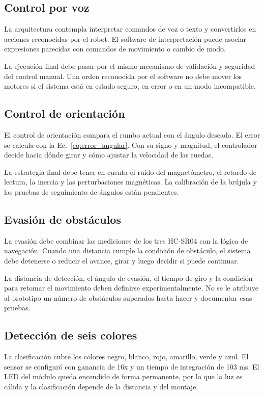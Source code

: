 \documentclass[journal]{IEEEtran}
\begin{document}
\subsection{Control por voz}

La arquitectura contempla interpretar comandos de voz o texto y convertirlos en acciones reconocidas por el robot. El software de interpretación puede asociar expresiones parecidas con comandos de movimiento o cambio de modo.

La ejecución final debe pasar por el mismo mecanismo de validación y seguridad del control manual. Una orden reconocida por el software no debe mover los motores si el sistema está en estado seguro, en error o en un modo incompatible.

\subsection{Control de orientación}

El control de orientación compara el rumbo actual con el ángulo deseado. El error se calcula con la Ec.~\ref{eq:error_angular}. Con su signo y magnitud, el controlador decide hacia dónde girar y cómo ajustar la velocidad de las ruedas.

La estrategia final debe tener en cuenta el ruido del magnetómetro, el retardo de lectura, la inercia y las perturbaciones magnéticas. La calibración de la brújula y las pruebas de seguimiento de ángulos están pendientes.

\subsection{Evasión de obstáculos}

La evasión debe combinar las mediciones de los tres HC-SR04 con la lógica de navegación. Cuando una distancia cumple la condición de obstáculo, el sistema debe detenerse o reducir el avance, girar y luego decidir si puede continuar.

La distancia de detección, el ángulo de evasión, el tiempo de giro y la condición para retomar el movimiento deben definirse experimentalmente. No se le atribuye al prototipo un número de obstáculos superados hasta hacer y documentar esas pruebas.

\subsection{Detección de seis colores}

La clasificación cubre los colores negro, blanco, rojo, amarillo, verde y azul. El sensor se configuró con ganancia de 16x y un tiempo de integración de 103 ms. El LED del módulo queda encendido de forma permanente, por lo que la luz es cálida y la clasificación depende de la distancia y del montaje.
\end{document}
